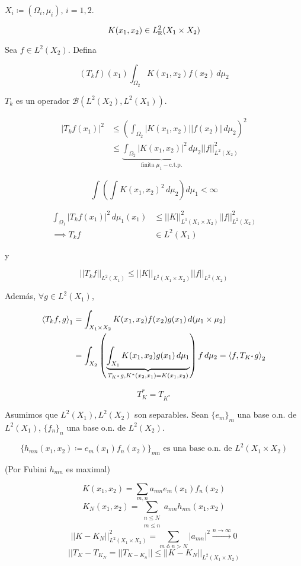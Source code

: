 \begin{fexample}
   $X_i\coloneqq(\Omega_i,\mu_i)$, $i=1,2$.

   \[K(x_1,x_2)\in L^2_{\mathbb{R}}(X_1\times X_2)\]

   Sea $f\in L^2(X_2)$. Defina

   \[(T_k f)(x_1)\int_{\Omega_2}K(x_1,x_2)f(x_2)\,d\mu_2\]

   $T_k$ es un operador $\mathcal{B}(L^2(X_2),L^2(X_1))$.

   \begin{align*}
       |T_k f(x_1)|^2&\leq \left(\int_{\Omega_2}|K(x_1,x_2)||f(x_2)|\,d\mu_2\right)^2\\
       &\leq \underbrace{\int_{\Omega_2} |K(x_1,x_2)|^2\,d\mu_2}_{\text{finita } \mu_1-\text{c.t.p.}} ||f||_{L^2(X_2)}^2
   \end{align*}

   \[\int\left(\int K(x_1,x_2)^2\,d\mu_2\right)d\mu_1<\infty\]

   \begin{align*}
       \int_{\Omega_1}|T_k f(x_1)|^2\,d\mu_1(x_1)&\leq ||K||_{L^1(X_1\times X_2)}^2||f||_{L^2(X_2)}^2\\
       \implies T_k f&\in L^2(X_1)
   \end{align*}

   y 

   \[||T_k f||_{L^2(X_1)}\leq ||K||_{L^2(X_1\times X_2)}||f||_{L^2(X_2)}\]

   Además, $\forall g\in L^2(X_1)$, 

   \begin{align*}
       \left\langle T_k f,g\right\rangle_1&=\int_{X_1\times X_2} K(x_1,x_2)f(x_2)g(x_1)\,d(\mu_1\times \mu_2)\\
       &=\int_{X_2}\left(\underbrace{\int_{X_1}K(x_1,x_2)g(x_1)\,d\mu_1}_{T_{K^*}g, K^*(x_2,x_1)=K(x_1,x_2)}\right) f\,d\mu_2=\left\langle f,T_{K^*}g\right\rangle_2
   \end{align*}

   \[T_K^*=T_{K^*}\]

   Asumimos que $L^2(X_1), L^2(X_2)$ son separables. Sean $\{e_m\}_m$ una base o.n. de $L^2(X_1)$, $\{f_n\}_n$ una base o.n. de $L^2(X_2)$. 

   \[\{h_{mn}(x_1,x_2)\coloneqq e_m(x_1)f_n(x_2)\}_{mn}\text{ es una base o.n. de }L^2(X_1\times X_2)\]

   (Por Fubini $h_{mn}$ es maximal)

   \[K(x_1,x_2)=\sum_{m,n}a_{mn}e_m(x_1)f_n(x_2)\]
   \[K_N(x_1,x_2)=\sum_{\substack{n\leq N\\m\leq n}}a_{mn}h_{mn}(x_1,x_2)\]
   \[||K-K_N||_{L^2(X_1\times X_2)}^2=\sum_{m\text{ ó }n>N} |a_{mn}|^2\xrightarrow{n\to\infty} 0\]
   \[||T_K-T_{K_N}=||T_{K-K_n}||\leq ||K-K_N||_{L^2(X_1\times X_2)}\]


\end{fexample}
